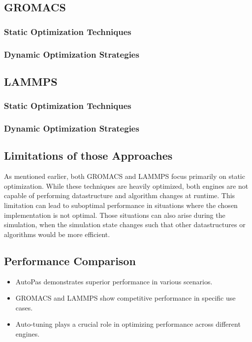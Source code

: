 \documentclass[conference]{IEEEtran}
\begin{document}
\subsection{GROMACS}

\subsubsection{Static Optimization Techniques}


\subsubsection{Dynamic Optimization Strategies}




\subsection{LAMMPS}

\subsubsection{Static Optimization Techniques}


\subsubsection{Dynamic Optimization Strategies}



\subsection*{Limitations of those Approaches}

As mentioned earlier, both GROMACS and LAMMPS focus primarily on static optimization. While these techniques are heavily optimized, both engines are not capable of performing datastructure and algorithm changes at runtime. This limitation can lead to suboptimal performance in situations where the chosen implementation is not optimal. Those situations can also arise during the simulation, when the simulation state changes such that other datastructures or algorithms would be more efficient.




\subsection{Performance Comparison}
\begin{itemize}
    \item AutoPas demonstrates superior performance in various scenarios.
    \item GROMACS and LAMMPS show competitive performance in specific use cases.
    \item Auto-tuning plays a crucial role in optimizing performance across different engines.
\end{itemize}
\end{document}
